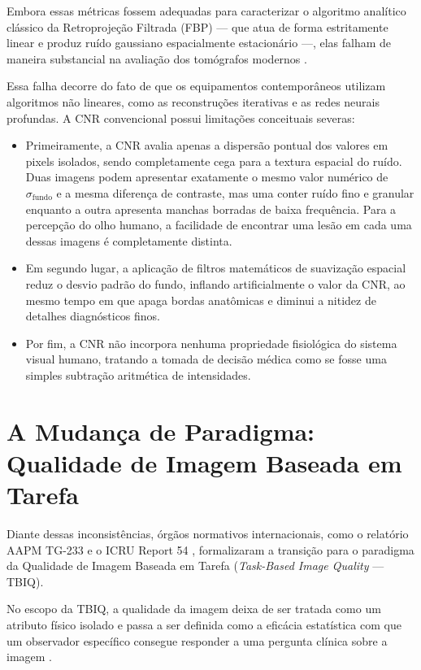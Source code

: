 Embora essas métricas fossem adequadas para caracterizar o algoritmo analítico clássico da Retroprojeção Filtrada (FBP) --- que atua de forma estritamente linear e produz ruído gaussiano espacialmente estacionário ---, elas falham de maneira substancial na avaliação dos tomógrafos modernos \cite{aapm_tg233_2019}.

Essa falha decorre do fato de que os equipamentos contemporâneos utilizam algoritmos não lineares, como as reconstruções iterativas e as redes neurais profundas. A CNR convencional possui limitações conceituais severas:
\begin{itemize}
  \item Primeiramente, a CNR avalia apenas a dispersão pontual dos valores em pixels isolados, sendo completamente cega para a textura espacial do ruído. Duas imagens podem apresentar exatamente o mesmo valor numérico de $\sigma_{\text{fundo}}$ e a mesma diferença de contraste, mas uma conter ruído fino e granular enquanto a outra apresenta manchas borradas de baixa frequência. Para a percepção do olho humano, a facilidade de encontrar uma lesão em cada uma dessas imagens é completamente distinta.
  \item Em segundo lugar, a aplicação de filtros matemáticos de suavização espacial reduz o desvio padrão do fundo, inflando artificialmente o valor da CNR, ao mesmo tempo em que apaga bordas anatômicas e diminui a nitidez de detalhes diagnósticos finos.
  \item Por fim, a CNR não incorpora nenhuma propriedade fisiológica do sistema visual humano, tratando a tomada de decisão médica como se fosse uma simples subtração aritmética de intensidades.
\end{itemize}

\section{A Mudança de Paradigma: Qualidade de Imagem Baseada em Tarefa}
\label{sec:mudanca_paradigma}

Diante dessas inconsistências, órgãos normativos internacionais, como o relatório AAPM TG-233 \cite{aapm_tg233_2019} e o ICRU Report 54 \cite{icru54_1996}, formalizaram a transição para o paradigma da Qualidade de Imagem Baseada em Tarefa (\emph{Task-Based Image Quality} --- TBIQ).

No escopo da TBIQ, a qualidade da imagem deixa de ser tratada como um atributo físico isolado e passa a ser definida como a eficácia estatística com que um observador específico consegue responder a uma pergunta clínica sobre a imagem \cite{barrett_myers_2004}.

